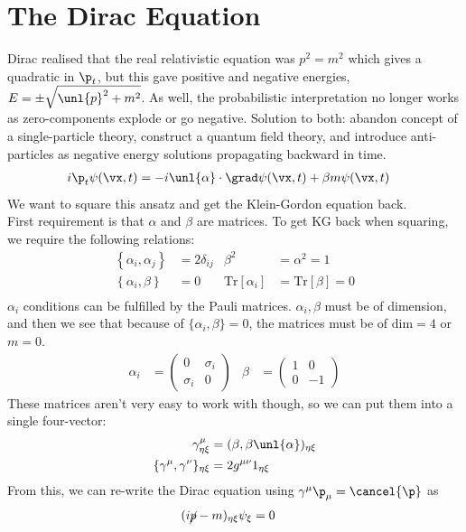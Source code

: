 \documentclass[a4paper, 11pt, normalem]{report}
\begin{document}
\section{The Dirac Equation}
Dirac realised that the real relativistic equation was $p^2 = m^2$ which gives a quadratic in $\p_t$, but this gave positive and negative energies, $E = \pm\sqrt{\unl{p}^2+m^2}$.
As well, the probabilistic interpretation no longer works as zero-components explode or go negative.
Solution to both: abandon concept of a single-particle theory, construct a quantum field theory, and introduce anti-particles as negative energy solutions propagating backward in time.
\begin{align}
    i\p_t\psi(\vx,t) &= -i\unl{\alpha}\cdot\grad\psi(\vx,t) + \beta m\psi(\vx,t)
\end{align}
We want to square this ansatz and get the Klein-Gordon equation back. \\
First requirement is that $\alpha$ and $\beta$ are matrices.
To get KG back when squaring, we require the following relations:
\begin{align}
    \left\{\alpha_i,\alpha_j\right\} &= 2\delta_{ij} & \beta^2 &= \alpha^2 = 1 \\
    \left\{\alpha_i,\beta\right\} &= 0 & \text{Tr}[\alpha_i] &= \text{Tr}[\beta] = 0 \\
\end{align}
$\alpha_i$ conditions can be fulfilled by the Pauli matrices.
$\alpha_i,\beta$ must be of  dimension, and then we see that because of $\{\alpha_i,\beta\} = 0$, the matrices must be of $\text{dim} = 4$ or $m=0$.
\begin{align}
    \alpha_i &= \begin{pmatrix} 0 & \sigma_i \\ \sigma_i & 0\end{pmatrix} & \beta &= \begin{pmatrix}1 & 0\\ 0& -1\end{pmatrix}
\end{align}
These matrices aren't very easy to work with though, so we can put them into a single four-vector:
\begin{align}
    \gamma^\mu_{\eta\xi} &= (\beta,\beta\unl{\alpha})_{\eta\xi} \\
    \{\gamma^\mu,\gamma^\nu\}_{\eta\xi} &= 2g^{\mu\nu}1_{\eta\xi}
\end{align}
From this, we can re-write the Dirac equation using $\gamma^\mu\p_\mu = \cancel{\p}$ as
\begin{align}
    (i\cancel{p}-m)_{\eta\xi}\psi_{\xi} &= 0
\end{align}
\end{document}

